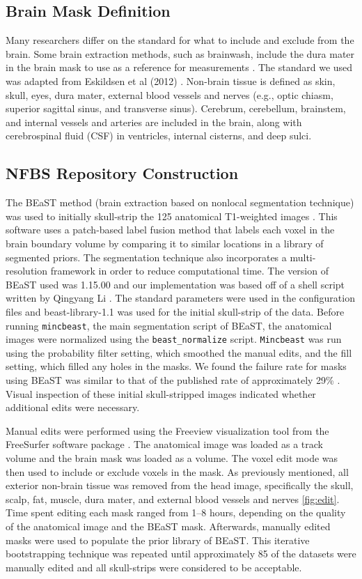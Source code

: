 \documentclass{bmcart}
\begin{document}
\subsection*{Brain Mask Definition}
Many researchers differ on the standard for what to include and exclude from the brain. Some brain extraction methods, such as brainwash, include the dura mater in the brain mask to use as a reference for measurements \cite{Brainwash}. The standard we used was adapted from Eskildsen et al (2012) \cite{Eskildsen2012}. Non-brain tissue is defined as skin, skull, eyes, dura mater, external blood vessels and nerves (e.g., optic chiasm, superior sagittal sinus, and transverse sinus). Cerebrum, cerebellum, brainstem, and internal vessels and arteries are included in the brain, along with cerebrospinal fluid (CSF) in ventricles, internal cisterns, and deep sulci. 


\subsection*{NFBS Repository Construction}
The BEaST method (brain extraction based on nonlocal segmentation technique) was used to initially skull-strip the 125 anatomical T1-weighted images \cite{Eskildsen2012}. This software uses a patch-based label fusion method that labels each voxel in the brain boundary volume by comparing it to similar locations in a library of segmented priors. The segmentation technique also incorporates a multi-resolution framework in order to reduce computational time. The version of BEaST used was 1.15.00 and our implementation was based off of a shell script written by Qingyang Li \cite{rpubs}. The standard parameters were used in the configuration files and beast-library-1.1 was used for the initial skull-strip of the data. Before running {\tt mincbeast}, the main segmentation script of BEaST, the anatomical images were normalized using the {\tt beast\_normalize} script. {\tt Mincbeast} was run using the probability filter setting, which smoothed the manual edits, and the fill setting, which filled any holes in the masks. We found the failure rate for masks using BEaST was similar to that of the published rate of approximately 29\% \cite{Eskildsen2012}. Visual inspection of these initial skull-stripped images indicated whether additional edits were necessary. 

Manual edits were performed using the Freeview visualization tool from the FreeSurfer software package \cite{freesurfer}. The anatomical image was loaded as a track volume and the brain mask was loaded as a volume. The voxel edit mode was then used to include or exclude voxels in the mask. As previously mentioned, all exterior non-brain tissue was removed from the head image, specifically the skull, scalp, fat, muscle, dura mater, and external blood vessels and nerves \ref{fig:edit}. Time spent editing each mask ranged from 1--8 hours, depending on the quality of the anatomical image and the BEaST mask. Afterwards, manually edited masks were used to populate the prior library of BEaST. This iterative bootstrapping technique was repeated until approximately 85 of the datasets were manually edited and all skull-strips were considered to be acceptable. 
\end{document}
